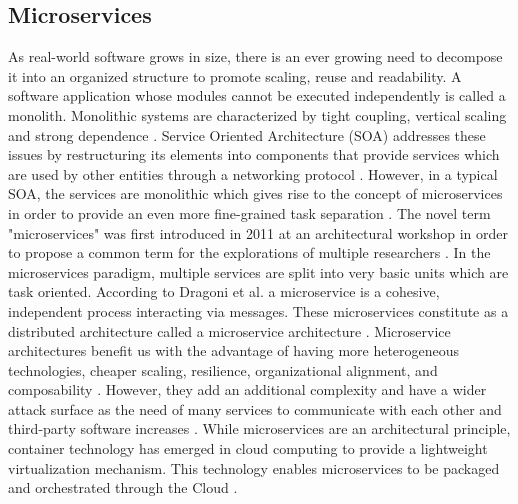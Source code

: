 \subsection{Microservices}
\label{chap:microservices}

As real-world software grows in size, there is an ever growing need to decompose it into an organized structure to promote scaling, reuse and readability. A software application whose modules cannot be executed independently is called a monolith. Monolithic systems  are characterized by tight coupling, vertical scaling and strong dependence \cite{microservicesfrowler}. Service Oriented Architecture (SOA) addresses these issues by restructuring its elements into components that provide services which are used by other entities through a networking protocol \cite{papazoglou2003service}. However, in a typical SOA, the services are monolithic which gives rise to the concept of microservices in order to provide an even more fine-grained task separation \cite{ahmadvand2016requirements}. The novel term "microservices" was first introduced in 2011 at an architectural workshop in order to propose a common term for the explorations of multiple researchers \cite{dragoni2017microservices, microservicesfrowler}. In the microservices paradigm, multiple services are split into very basic units which are task oriented. According to Dragoni et al. a microservice is a cohesive, independent process interacting via messages. These microservices constitute as a distributed architecture called a microservice architecture \cite{dragoni2017microservices}. Microservice architectures benefit us with the advantage of having more heterogeneous technologies, cheaper scaling, resilience, organizational alignment, and composability \cite{newman2015building}. However, they add an additional complexity and have a wider attack surface as the need of many services to communicate with each other and third-party software increases \cite{combe2016docker, dragoni2017microservices}. While microservices are an architectural principle, container technology has emerged in cloud computing to provide a lightweight virtualization mechanism. This technology enables microservices to be packaged and orchestrated through the Cloud \cite{pahl2016microservices}.


